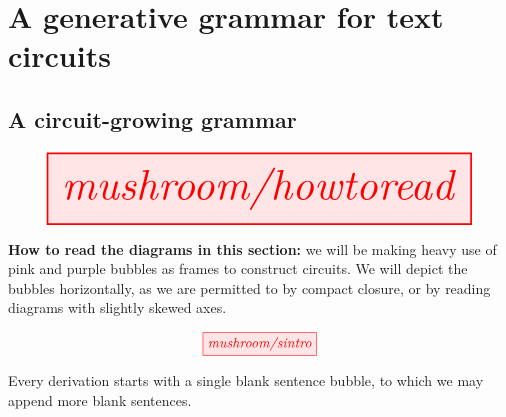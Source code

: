 \newpage

\section{A generative grammar for text circuits}\label{sec:gencirc}

\subsection{A circuit-growing grammar}



\begin{marginfigure}
\centering
\[
\resizebox{\textwidth}{!}{\tikzfig{mushroom/howtoread}}
\]
\caption{\textbf{How to read the diagrams in this section:} we will be making heavy use of pink and purple bubbles as frames to construct circuits. We will depict the bubbles horizontally, as we are permitted to by compact closure, or by reading diagrams with slightly skewed axes.}
\end{marginfigure}

\begin{marginfigure}
\centering
\[
\tikzfig{mushroom/sintro}
\]
\caption{Every derivation starts with a single blank sentence bubble, to which we may append more blank sentences.}
\end{marginfigure}

